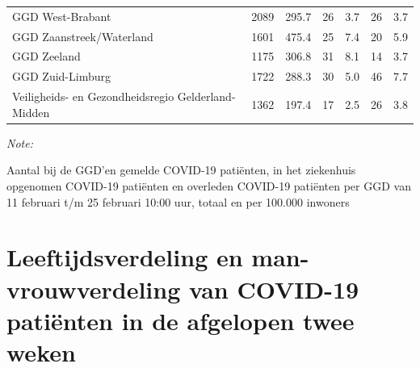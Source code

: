 \documentclass[
  english,
  man,floatsintext]{apa6}
\begin{document}
\begin{table}[H]
\begin{threeparttable}
\begin{tabular}{lrrrrrr}
GGD West-Brabant & 2089 & 295.7 & 26 & 3.7 & 26 & 3.7\\
GGD Zaanstreek/Waterland & 1601 & 475.4 & 25 & 7.4 & 20 & 5.9\\
GGD Zeeland & 1175 & 306.8 & 31 & 8.1 & 14 & 3.7\\
GGD Zuid-Limburg & 1722 & 288.3 & 30 & 5.0 & 46 & 7.7\\
Veiligheids- en Gezondheidsregio Gelderland-Midden & 1362 & 197.4 & 17 & 2.5 & 26 & 3.8\\
\bottomrule
\end{tabular}
\begin{tablenotes}
\item \textit{Note: } 
\item Aantal bij de GGD’en gemelde COVID-19 patiënten, in het ziekenhuis opgenomen COVID-19 patiënten en overleden COVID-19 patiënten per GGD van 11 februari t/m 25 februari 10:00 uur, totaal en per 100.000 inwoners
\end{tablenotes}
\end{threeparttable}
\endgroup{}
\end{table}

\newpage

\hypertarget{leeftijdsverdeling-en-man-vrouwverdeling-van-covid-19-patiuxebnten-in-de-afgelopen-twee-weken}{%
\section{Leeftijdsverdeling en man-vrouwverdeling van COVID-19 patiënten in de afgelopen twee weken}\label{leeftijdsverdeling-en-man-vrouwverdeling-van-covid-19-patiuxebnten-in-de-afgelopen-twee-weken}}
\end{document}
